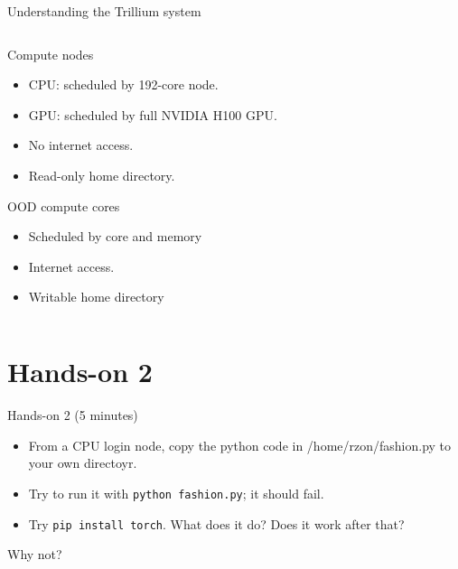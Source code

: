 \documentclass[
  10pt,
  ignorenonframetext,
  aspectratio=169,handout]{beamer}
\providecommand{\tightlist}{%
  \setlength{\itemsep}{0pt}\setlength{\parskip}{0pt}}
\begin{document}
\begin{frame}{Understanding the Trillium system}
\begin{columns}[T]
\begin{column}{0.47\linewidth}
\begin{block}{Compute nodes}\setlength{\parskip}{0.5\baselineskip}
\label{compute-nodes-1}
\vspace{-1mm}

\begin{itemize}
\tightlist
\item
  CPU: scheduled by 192-core node.
\item
  GPU: scheduled by full NVIDIA H100 GPU.
\item
  No internet access.
\item
  Read-only home directory.
\end{itemize}
\end{block}

\begin{block}{OOD compute cores}\setlength{\parskip}{0.5\baselineskip}
\label{ood-compute-cores-1}
\vspace{-1mm}

\begin{itemize}
\tightlist
\item
  Scheduled by core and memory
\item
  Internet access.
\item
  Writable home directory
\end{itemize}
\end{block}
\end{column}
\end{columns}
\end{frame}

\section{Hands-on 2}\label{hands-on-2}

\begin{frame}[fragile]{Hands-on 2 (5 minutes)}
\label{hands-on-2-5-minutes}
\begin{itemize}
\item
  From a CPU login node, copy the python code in /home/rzon/fashion.py to your own directoyr.
\item
  Try to run it with \texttt{python\ fashion.py}; it should fail.
\item
  Try \texttt{pip\ install\ torch}. What does it do? Does it work after that?
\end{itemize}

Why not?
\end{frame}
\end{document}
